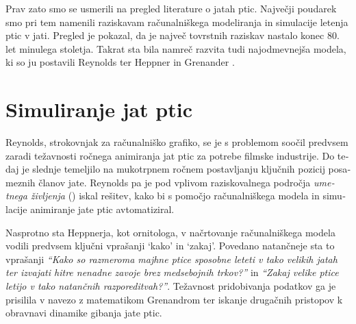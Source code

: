 \begin{slovenian}
Prav zato smo se usmerili na pregled literature o jatah ptic. Največji poudarek smo pri tem namenili raziskavam računalniškega modeliranja in simulacije letenja ptic v jati. Pregled je pokazal, da je največ tovrstnih raziskav nastalo konec 80. let minulega stoletja. Takrat sta bila namreč razvita tudi najodmevnejša modela, ki so ju postavili Reynolds \cite{reynolds:1987} ter Heppner in Grenander \cite{heppner:1990}. 

\section{Simuliranje jat ptic}
Reynolds, strokovnjak za računalniško grafiko, se je s problemom soočil predvsem zaradi težavnosti ročnega animiranja jat ptic za potrebe filmske industrije. Do tedaj je slednje temeljilo na mukotrpnem ročnem postavljanju ključnih pozicij posameznih članov jate. Reynolds pa je pod vplivom raziskovalnega področja \emph{umetnega življenja} () iskal rešitev, kako bi s pomočjo računalniškega modela in simulacije animiranje jate ptic avtomatiziral. 

Nasprotno sta Heppnerja, kot ornitologa, v načrtovanje računalniškega modela vodili predvsem ključni vprašanji `kako' in `zakaj'. Povedano natančneje sta to vprašanji \emph{``Kako so razmeroma majhne ptice sposobne leteti v tako velikih jatah ter izvajati hitre nenadne zavoje brez medsebojnih trkov?''} in \emph{``Zakaj velike ptice letijo v tako natančnih razporeditvah?''}. Težavnost pridobivanja podatkov ga je prisilila v navezo z matematikom Grenandrom ter iskanje drugačnih pristopov k obravnavi dinamike gibanja jate ptic. 


\end{slovenian}
